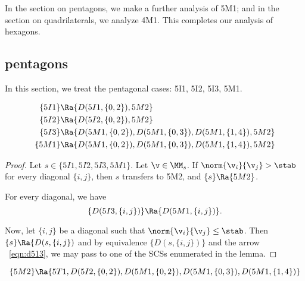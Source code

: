 In the section on pentagons, we make a further analysis of 5M1; and in the section on quadrilaterals, we analyze 4M1.
This completes our analysis of hexagons.  

\subsection{pentagons}

In this section, we treat the pentagonal cases: 5I1, 5I2, 5I3, 5M1.

\begin{lemma}[]
\begin{align*}
\{5I1\}&\Ra \{D(5I1,\{0,2\}),5M2\}\\
\{5I2\}&\Ra \{D(5I2,\{0,2\}),5M2\}\\
\{5I3\}&\Ra \{D(5M1,\{0,2\}),D(5M1,\{0,3\}),D(5M1,\{1,4\}),5M2\}\\
\{5M1\}&\Ra \{D(5M1,\{0,2\}),D(5M1,\{0,3\}),D(5M1,\{1,4\}),5M2\}\\
\end{align*}
\end{lemma}

\begin{proof}
Let  $s\in \{5I1,5I2,5I3,5M1\}$.
Let $\v\in\MM_s$.  If $\norm{\v_i}{\v_j}>\stab$ for every diagonal $\{i,j\}$, then $s$ transfers to 5M2,
and $\{s\}\Ra \{5M2\}$.

For every diagonal,
we have 
\begin{equation}\label{eqn:d513}
\{D(5I3,\{i,j\})\}\Ra \{D(5M1,\{i,j\})\}.
\end{equation}

Now, let $\{i,j\}$ be a diagonal such that $\norm{\v_i}{\v_j}\le \stab$.  
Then $\{s\}\Ra \{D(s,\{i,j\})$ and by equivalence $\{D(s,\{i,j\})\}$ and the arrow ~\eqref{eqn:d513},
we may pass to one of the SCSs enumerated in the lemma.
\end{proof}

\begin{lemma}[]
\[
\{5M2\}\Ra \{5T1,D(5I2,\{0,2\}),D(5M1,\{0,2\}),D(5M1,\{0,3\}),D(5M1,\{1,4\}) \}
\]
\end{lemma}

